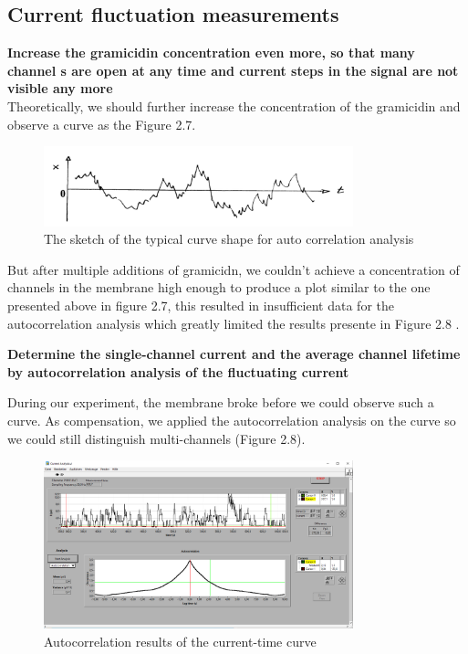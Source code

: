 \documentclass[a4paper,english,12pt,bibliography=totoc]{scrreprt}
\begin{document}
\subsection{Current fluctuation measurements}

\textbf{Increase the gramicidin concentration even more, so that many channel s are open
at any time and current steps in the signal are not visible any more}\\
Theoretically, we should further increase the concentration of the gramicidin and observe a curve as the Figure 2.7.

\begin{figure}[H]
    \centering
    \includegraphics[width = 0.8\textwidth]{Group 8/theoritical plot of auto.png}
    \caption{The sketch of the typical curve shape for auto correlation analysis}
    \label{fig:enter-label}
\end{figure}

But after multiple additions of gramicidn, we couldn't achieve a concentration of channels in the membrane high enough to produce a plot similar to the one presented above in figure 2.7, this resulted in insufficient data for the autocorrelation analysis which greatly limited the results presente in Figure 2.8 .


\textbf{Determine the single-channel current and the average channel lifetime by
autocorrelation analysis of the fluctuating current}

During our experiment, the membrane broke before we could observe such a curve. As compensation, we applied the autocorrelation analysis on the curve so we could still distinguish multi-channels (Figure 2.8). 

\begin{figure}[H]
    \centering
    \includegraphics[width = 0.8\textwidth]{Group 8/Autocorrelation.PNG}
    \caption{Autocorrelation results of the current-time curve}
    \label{fig:enter-label}
\end{figure}
\end{document}
